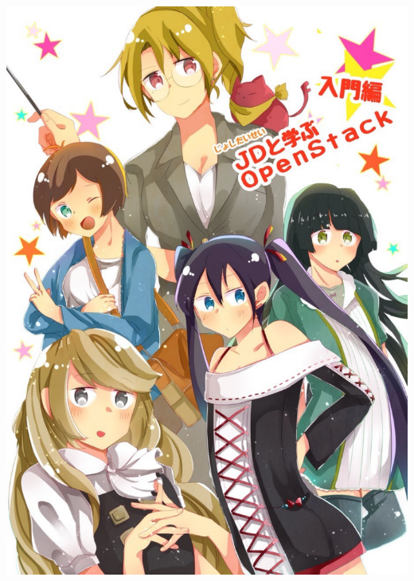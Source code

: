 \documentclass[9pt,b5paper,tombo,openany,dvipdfmx]{jsbook}
\begin{document}
\enlargethispage{\paperwidth}
\thispagestyle{empty}
\vspace*{-1truein}
\vspace*{-\topmargin}
\vspace*{-\headheight}
\vspace*{-\headsep}
\vspace*{-\topskip}
\noindent
\hspace*{-1truein}
\hspace*{-\oddsidemargin}
\includegraphics[width=1.02\paperwidth]{./img/cover.pdf}

\newpage

\setcounter{page}{1}

\thispagestyle{empty}
\end{document}
